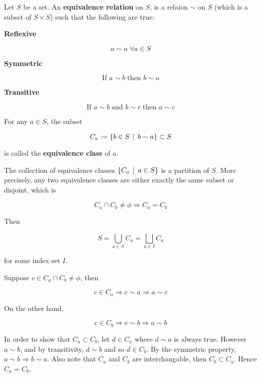 \documentclass[a4paper,12pt]{article}
\begin{document}
\begin{dft}
  Let $S$ be a set. An \textbf{equivalence relation} on $S$, is a relaion $\sim$ on $S$ (which is a subset of $S\times S$) such that the following are true:

  \begin{alist}
    \propdisp

    \item \textbf{Reflexive}

    $$a\sim a\;\forall a\in S$$

    \item \textbf{Symmetric}

    $$\text{If }a\sim b\;\text{then }b\sim a$$

    \item \textbf{Transitive}

    $$\text{If }a\sim b\;\text{and }b\sim c\;\text{then }a\sim c$$
  \end{alist}
\end{dft}\n

\begin{dft}
  For any $a\in S$, the subset

  $$C_{a}:=\left\{ b\in S\,\mid\, b\sim a\right\}\subset S$$\s

  is called the \textbf{equivalence class} of $a$.
\end{dft}\n

\begin{pst}
  The collection of equivalence classes $\left\{ C_{a}\,\mid\, a\in S\right\}$ is a partition of $S$. More precisely, any two equivalence classes are either exactly the same subset or disjoint, which is

  $$C_{a}\cap C_{b}\neq\phi\Rightarrow C_{a}=C_{b}$$\s

  Then

  $$S=\bigcup_{a\in S}C_{a}=\bigsqcup_{a\in I}C_{a}$$\s

  for some index set $I$.\n

  \prf Suppose $c\in C_{a}\cap C_{b}\neq\phi$, then

  $$c\in C_{a}\Rightarrow c\sim a\Rightarrow a\sim c$$\s

  On the other hand,

  $$c\in C_{b}\Rightarrow c\sim b\Rightarrow a\sim b$$\s

  In order to show that $C_{a}\subset C_{b}$, let $d\in C_{a}$ where $d\sim a$ is always true. However $a\sim b$, and by transitivity, $d\sim b$ and so $d\in C_{b}$. By the symmetric property, $a\sim b\Rightarrow b\sim a$. Also note that $C_{a}$ and $C_{b}$ are interchangable, then $C_{b}\subset C_{a}$. Hence $C_{a}=C_{b}$.
\end{pst}
\end{document}
